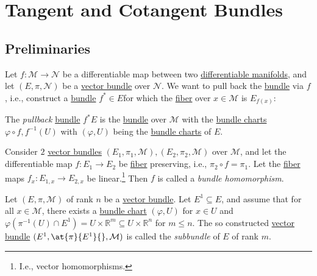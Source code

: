 \section{Tangent and Cotangent Bundles}
\subsection{Preliminaries}
Let \(f\colon \mathcal{M} \to \mathcal{N} \) be a differentiable map between two \hyperref[def:smooth-manifold]{differentiable manifolds}, and let \((E, \pi , \mathcal{N} )\)  be a \hyperref[def:vector-bundle]{vector bundle} over \(\mathcal{N} \). We want to pull back the \hyperref[def:vector-bundle]{bundle} via \(f\), i.e., construct a \hyperref[def:vector-bundle]{bundle} \(f^{\ast} \in E\)for which the \hyperref[def:fiber]{fiber} over \(x\in \mathcal{M} \) is \(E_{f(x)}\):

\begin{definition}[Pullback]\label{def:pullback}
	The \emph{pullback} \hyperref[def:vector-bundle]{bundle} \(f^{\ast} E\) is the \hyperref[def:vector-bundle]{bundle} over \(\mathcal{M} \) with the \hyperref[def:bundle-chart]{bundle charts} \(\varphi \circ f, f^{-1} (U)\) with \((\varphi , U)\) being the \hyperref[def:bundle-chart]{bundle charts} of \(E\).
\end{definition}

\begin{definition}\label{def:bundle-homomorphism}
	Consider \(2\) \hyperref[def:vector-bundle]{vector bundles} \((E_1, \pi _1, \mathcal{M} ), (E_2, \pi _2, \mathcal{M} )\) over \(\mathcal{M} \), and let the differentiable map \(f\colon E_1 \to E_2\) be \hyperref[def:fiber]{fiber} preserving, i.e., \(\pi _2 \circ f = \pi _1\). Let the \hyperref[def:fiber]{fiber} maps \(f_x \colon E_{1,x} \to E_{2,x}\) be linear.\footnote{I.e., vector homomorphisms.} Then \(f\) is called a \emph{bundle homomorphism}.
\end{definition}

\begin{definition}[Subbundle]\label{def:subbundle}
	Let \((E, \pi , \mathcal{M} )\) of rank \(n\) be a \hyperref[def:vector-bundle]{vector bundle}. Let \(E^1 \subseteq E\), and assume that for all \(x\in \mathcal{M} \), there exists a \hyperref[def:bundle-chart]{bundle chart} \((\varphi , U)\) for \(x\in U\) and \(\varphi (\pi ^{-1} (U) \cap E^1) = U \times \mathbb{R} ^m \subseteq U \times \mathbb{R} ^n\) for \(m \leq n\). The so constructed \hyperref[def:vector-bundle]{vector bundle} \((E^1, \at{\pi }{E^1}{}, \mathcal{M} )\) is called the \emph{subbundle} of \(E\) of rank \(m\).
\end{definition}

